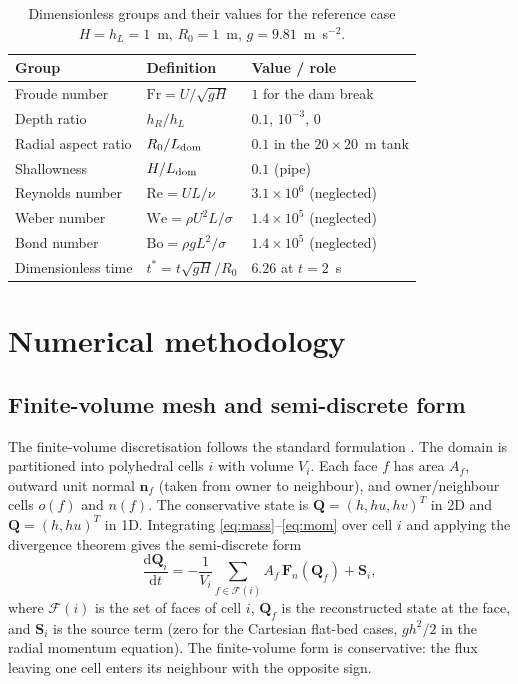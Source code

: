 ﻿\documentclass[11pt,a4paper]{article}
\newcommand{\Froude}{\mathrm{Fr}}
\newcommand{\Rey}{\mathrm{Re}}
\newcommand{\We}{\mathrm{We}}
\newcommand{\Bo}{\mathrm{Bo}}
\newcommand{\bn}{\mathbf{n}}
\newcommand{\bF}{\mathbf{F}}
\newcommand{\bQ}{\mathbf{Q}}
\newcommand{\bS}{\mathbf{S}}
\begin{document}
\begin{table}[H]
\centering
\caption{Dimensionless groups and their values for the reference case
$H=h_L=1$~m, $R_0=1$~m, $g=9.81$~m~s$^{-2}$.}
\label{tab:dimensionless}
\small
\begin{tabular}{@{}lll@{}}
\toprule
Group & Definition & Value / role\\
\midrule
Froude number & $\Froude=U/\sqrt{gH}$ & $1$ for the dam break\\
Depth ratio & $h_R/h_L$ & $0.1$, $10^{-3}$, $0$\\
Radial aspect ratio & $R_0/L_{\rm dom}$ & $0.1$ in the $20\times20$~m tank\\
Shallowness & $H/L_{\rm dom}$ & $0.1$ (pipe)\\
Reynolds number & $\Rey=UL/\nu$ & $3.1\times10^{6}$ (neglected)\\
Weber number & $\We=\rho U^2L/\sigma$ & $1.4\times10^{5}$ (neglected)\\
Bond number & $\Bo=\rho gL^2/\sigma$ & $1.4\times10^{5}$ (neglected)\\
Dimensionless time & $t^*=t\sqrt{gH}/R_0$ & $6.26$ at $t=2$~s\\
\bottomrule
\end{tabular}
\end{table}

\section{Numerical methodology}
\label{sec:num}

\subsection{Finite-volume mesh and semi-discrete form}
The finite-volume discretisation follows the standard formulation
\cite{leveque2002,toro2009}.  The domain is partitioned into polyhedral
cells $i$ with volume $V_i$.  Each
face $f$ has area $A_f$, outward unit normal $\bn_f$ (taken from owner to
neighbour), and owner/neighbour cells $o(f)$ and $n(f)$.  The conservative
state is $\bQ=(h,hu,hv)^T$ in 2D and $\bQ=(h,hu)^T$ in 1D.  Integrating
\eqref{eq:mass}--\eqref{eq:mom} over cell $i$ and applying the divergence
theorem gives the semi-discrete form
\begin{equation}
  \frac{\mathrm{d}\bQ_i}{\mathrm{d}t}
  = -\frac{1}{V_i}\sum_{f\in\mathcal{F}(i)} A_f\,\bF_n(\bQ_f)
  + \bS_i ,
  \label{eq:semi}
\end{equation}
where $\mathcal{F}(i)$ is the set of faces of cell $i$, $\bQ_f$ is the
reconstructed state at the face, and $\bS_i$ is the source term (zero for the
Cartesian flat-bed cases, $g h^2/2$ in the radial momentum equation).  The
finite-volume form is conservative: the flux leaving one cell enters its
neighbour with the opposite sign.
\end{document}
